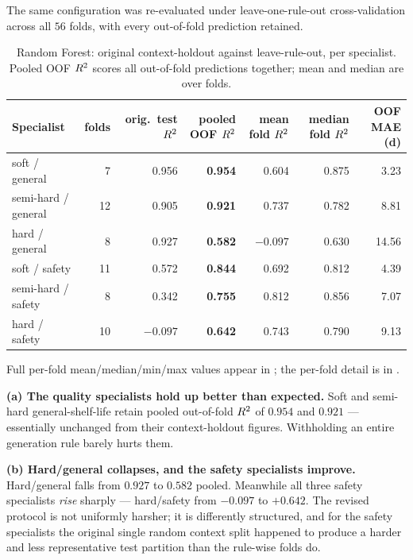 The same configuration was re-evaluated under leave-one-rule-out
cross-validation across all $56$ folds, with every out-of-fold prediction
retained.

\begin{table}[htbp]\centering\small
\caption{Random Forest: original context-holdout against leave-rule-out,
per specialist. Pooled OOF $R^2$ scores all out-of-fold predictions
together; mean and median are over folds.}
\label{tab:rf_revised}
\begin{tabular}{lrrrrrr}
\toprule
Specialist & folds & orig.\ test $R^2$ & pooled OOF $R^2$ & mean fold $R^2$ & median fold $R^2$ & OOF MAE (d) \\
\midrule
soft / general & 7 & 0.956 & \textbf{0.954} & 0.604 & 0.875 & 3.23 \\
semi-hard / general & 12 & 0.905 & \textbf{0.921} & 0.737 & 0.782 & 8.81 \\
hard / general & 8 & 0.927 & \textbf{0.582} & $-0.097$ & 0.630 & 14.56 \\
soft / safety & 11 & 0.572 & \textbf{0.844} & 0.692 & 0.812 & 4.39 \\
semi-hard / safety & 8 & 0.342 & \textbf{0.755} & 0.812 & 0.856 & 7.07 \\
hard / safety & 10 & $-0.097$ & \textbf{0.642} & 0.743 & 0.790 & 9.13 \\
\bottomrule
\end{tabular}
\end{table}

\noindent Full per-fold mean/median/min/max values appear in
; the per-fold detail is in
.

\begin{findingbox}[title=Two results that must be reported together]
\textbf{(a) The quality specialists hold up better than expected.} Soft and
semi-hard general-shelf-life retain pooled out-of-fold $R^2$ of $0.954$
and $0.921$ --- essentially unchanged from their context-holdout figures.
Withholding an entire generation rule barely hurts them.

\textbf{(b) Hard/general collapses, and the safety specialists improve.}
Hard/general falls from $0.927$ to $0.582$ pooled. Meanwhile all three
safety specialists \emph{rise} sharply --- hard/safety from $-0.097$ to
$+0.642$. The revised protocol is not uniformly harsher; it is differently
structured, and for the safety specialists the original single random
context split happened to produce a harder and less representative test
partition than the rule-wise folds do.
\end{findingbox}

